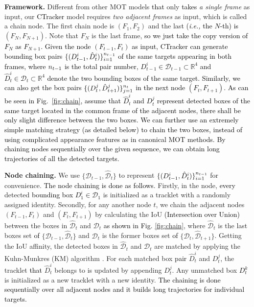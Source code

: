 \documentclass[../arXiv_main.tex]{subfiles}
\newcommand\pjl[1]{\textcolor{black}{#1}}
\newcommand\wfb[1]{\textcolor{black}{#1}}
\newcommand{\yang}[1]{\textcolor{black}{#1}}
\newcommand\CRwfb[1]{\textcolor{black}{#1}}
\newcommand{\CRyang}[1]{\textcolor{black}{#1}}
\begin{document}
\noindent\textbf{Framework.} Different from other MOT models \CRwfb{that} only \wfb{takes} \textit{a single frame} as input, our \yang{CTracker} model requires \textit{two adjacent frames} as input, which is called a chain node. The first chain node is $ (F_1,F_2)$ and the last \CRyang{(\emph{i.e.,} the \CRwfb{$N$-th}) is} $ (F_N,F_{N+1})$. Note that $F_N$ is the last frame, \wfb{so we just take the copy version of $F_N$ as $F_{N+1}$.} \wfb{Given the node 
$(F_{t-1},F_{t})$ as input, \CRyang{CTracker} can generate \CRyang{bounding box pairs} 
$ \{(D_{t-1}^{i},\hat{D}_{t}^{i})\}_{i=1}^{\CRyang{n}_{t-1}}$ of the same \CRyang{targets appearing in both frames},}
\pjl{where $\CRyang{n}_{t-1}$ is the total pair number\CRyang{, $D_{t-1}^{i} \in \mathcal{D}_{t-1} \subset {\mathbb{R}^4}$ and $\hat{D}_{t}^{i} \in \mathcal{D}_t \subset {\mathbb{R}^4}$ denote} the two bounding boxes of the same target.
Similarly, we can also get the box pairs $ \{(D_{t}^{j},\hat{D}_{t+1}^{j})\}_{j=1}^{\CRyang{n}_{t}}$ in the next node $(F_{t},F_{t+1})$. 
As can be seen in Fig.~\ref{fig:chain}, assume that $\hat{D}_{t}^{i}$ and $ D_{t}^{j}$ \wfb{represent detected boxes of the same target located in the common frame of the adjacent nodes}, there \CRyang{shall be} only slight difference between \wfb{the} two boxes. \wfb{We can further use an extremely simple matching strategy (\CRyang{as detailed below}) to chain the two boxes, instead of using \CRyang{complicated appearance features} as in canonical MOT methods.}} \wfb{By chaining nodes \CRyang{sequentially over} the given sequence, \CRwfb{we can obtain \CRyang{long} trajectories of all the detected targets.}}


\noindent \textbf{Node chaining.} We use $ \{\mathcal{D}_{t-1},\mathcal{\hat{D}}_{t}\}$ to represent $ \{(D_{t-1}^{i},\hat{D}_{t}^{i})\}_{i=1}^{\CRyang{n}_{t-1}}$ for convenience. \CRyang{The node chaining is done as follows}. 
Firstly, in the node, \CRyang{every} detected \CRyang{bounding box $D_{1}^{i} \in \mathcal{D}_{1}$} is initialized as a tracklet with a randomly assigned identity. Secondly, for any another node $t$, we chain the adjacent nodes $(F_{t-1},F_{t})$ and $(F_{t},F_{t+1})$ by calculating the IoU \CRyang{(Intersection over Union)}  between the boxes in $\mathcal{\hat{D}}_{t}$ and $\mathcal{D}_{t}$ \CRyang{as shown in Fig. \ref{fig:chain}}, where $\mathcal{\hat{D}}_{t}$ is the last boxes set \CRyang{of} $\{\mathcal{D}_{t-1},{\mathcal{\hat{D}}_{t}}\}$ and $\mathcal{D}_{t}$ is the former boxes set \CRyang{of} $\{\mathcal{D}_{t},{\mathcal{\hat{D}}_{t+1}}\}$. Getting the IoU affinity, the detected boxes in $\mathcal{\hat{D}}_{t}$ and $\mathcal{D}_{t}$ are matched by applying the Kuhn-Munkres (KM) algorithm \cite{kuhn1955hungarian}. For each matched box \CRyang{pair} ${\hat{D}_{t}^{i}}$ and ${D_{t}^{j}}$, the tracklet \CRwfb{that} ${\hat{D}_{t}^{i}}$ belongs to is updated by appending ${D_{t}^{j}}$. Any unmatched box \CRyang{${D_{t}^{k}}$} is initialized as a new tracklet with a new identity. \CRyang{The chaining is done sequentially over all adjacent nodes and it builds long trajectories for individual targets.} 
\end{document}
